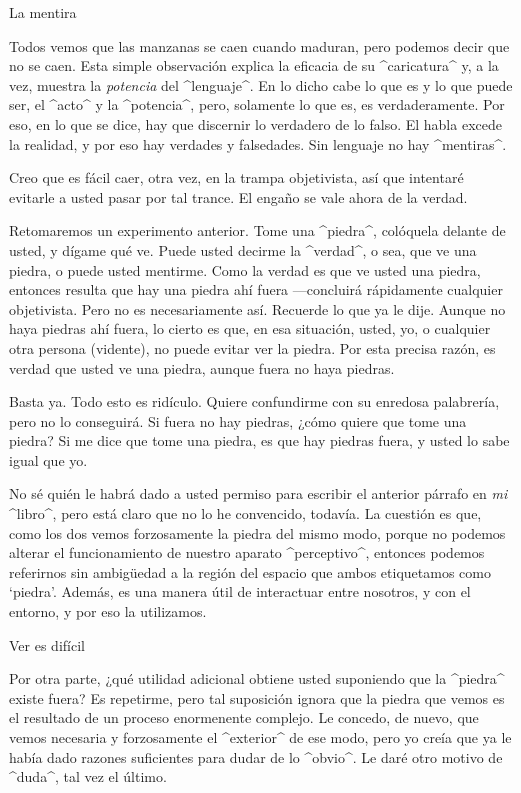 

\Section La mentira

Todos vemos que las manzanas se caen cuando maduran, pero podemos decir
que no se caen. Esta simple observación explica la eficacia de su
^caricatura^ y, a la vez, muestra la {\em potencia} del ^lenguaje^. En
lo dicho cabe lo que es y lo que puede ser, el ^acto^ y la ^potencia^,
pero, solamente lo que es, es verdaderamente. Por eso, en lo que se
dice, hay que discernir lo verdadero de lo falso. El habla excede la
realidad, y por eso hay verdades y falsedades. Sin lenguaje no hay
^mentiras^.

Creo que es fácil caer, otra vez, en la trampa objetivista, así que
intentaré evitarle a usted pasar por tal trance. El engaño se vale ahora
de la verdad.

Retomaremos un experimento anterior. Tome una ^piedra^, colóquela
delante de usted, y dígame qué ve. Puede usted decirme la ^verdad^, o
sea, que ve una piedra, o puede usted mentirme. Como la verdad es que ve
usted una piedra, entonces resulta que hay una piedra ahí fuera
---concluirá rápidamente cualquier objetivista. Pero no es
necesariamente así. Recuerde lo que ya le dije. Aunque no haya piedras
ahí fuera, lo cierto es que, en esa situación, usted, yo, o cualquier
otra persona (vidente), no puede evitar ver la piedra. Por esta precisa
razón, es verdad que usted ve una piedra, aunque fuera no haya piedras.

Basta ya. Todo esto es ridículo. Quiere confundirme con su enredosa
palabrería, pero no lo conseguirá. Si fuera no hay piedras, ¿cómo quiere
que tome una piedra? Si me dice que tome una piedra, es que hay piedras
fuera, y usted lo sabe igual que yo.

No sé quién le habrá dado a usted permiso para escribir el anterior
párrafo en {\em mi} ^libro^, pero está claro que no lo he convencido,
todavía. La cuestión es que, como los dos vemos forzosamente la piedra
del mismo modo, porque no podemos alterar el funcionamiento de nuestro
aparato ^perceptivo^, entonces podemos referirnos sin ambigüedad a la
región del espacio que ambos etiquetamos como `piedra'. Además, es una
manera útil de interactuar entre nosotros, y con el entorno, y por eso
la utilizamos.


\Section Ver es difícil

Por otra parte, ¿qué utilidad adicional obtiene usted suponiendo que la
^piedra^ existe fuera? Es repetirme, pero tal suposición ignora que la
piedra que vemos es el resultado de un proceso enormenente complejo. Le
concedo, de nuevo, que vemos necesaria y forzosamente el ^exterior^ de
ese modo, pero yo creía que ya le había dado razones suficientes para
dudar de lo ^obvio^. Le daré otro motivo de ^duda^, tal vez el último.

